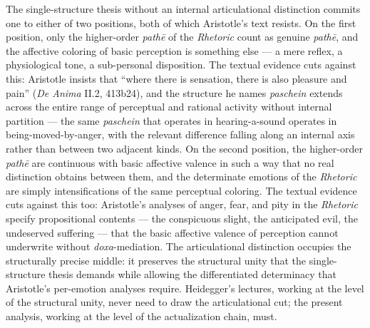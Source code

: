The single-structure thesis without an internal articulational distinction commits one to either of two positions, both of which Aristotle's text resists. On the first position, only the higher-order \textit{pathē} of the \textit{Rhetoric} count as genuine \textit{pathē}, and the affective coloring of basic perception is something else --- a mere reflex, a physiological tone, a sub-personal disposition. The textual evidence cuts against this: Aristotle insists that ``where there is sensation, there is also pleasure and pain'' (\textit{De Anima} II.2, 413b24), and the structure he names \textit{paschein} extends across the entire range of perceptual and rational activity without internal partition --- the same \textit{paschein} that operates in hearing-a-sound operates in being-moved-by-anger, with the relevant difference falling along an internal axis rather than between two adjacent kinds. On the second position, the higher-order \textit{pathē} are continuous with basic affective valence in such a way that no real distinction obtains between them, and the determinate emotions of the \textit{Rhetoric} are simply intensifications of the same perceptual coloring. The textual evidence cuts against this too: Aristotle's analyses of anger, fear, and pity in the \textit{Rhetoric} specify propositional contents --- the conspicuous slight, the anticipated evil, the undeserved suffering --- that the basic affective valence of perception cannot underwrite without \textit{doxa}-mediation. The articulational distinction occupies the structurally precise middle: it preserves the structural unity that the single-structure thesis demands while allowing the differentiated determinacy that Aristotle's per-emotion analyses require. Heidegger's lectures, working at the level of the structural unity, never need to draw the articulational cut; the present analysis, working at the level of the actualization chain, must.

